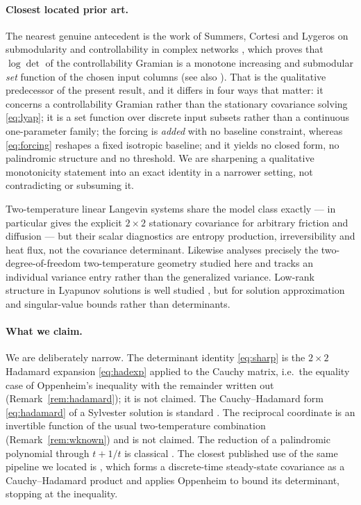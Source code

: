 \documentclass[11pt]{article}
\theoremstyle{plain}
\theoremstyle{definition}
\theoremstyle{remark}
\begin{document}
\paragraph{Closest located prior art.} The nearest genuine antecedent is the work of Summers,
Cortesi and Lygeros on submodularity and controllability in complex networks
\cite{SummersEtAl2016}, which proves that $\log\det$ of the controllability Gramian is a monotone
increasing and submodular \emph{set} function of the chosen input columns (see also
\cite{Antoulas2005}). That is the qualitative predecessor of the present result, and it differs in
four ways that matter: it concerns a controllability Gramian rather than the stationary covariance
solving \eqref{eq:lyap}; it is a set function over discrete input subsets rather than a continuous
one-parameter family; the forcing is \emph{added} with no baseline constraint, whereas
\eqref{eq:forcing} reshapes a fixed isotropic baseline; and it yields no closed form, no
palindromic structure and no threshold. We are sharpening a qualitative monotonicity statement
into an exact identity in a narrower setting, not contradicting or subsuming it.

Two-temperature linear Langevin systems
\cite{GodrecheLuck2019,FilligerReimann2007,DotsenkoEtAl2013} share the model class exactly --- in
particular \cite[\S2.10]{GodrecheLuck2019} gives the explicit $2\times2$ stationary covariance for
arbitrary friction and diffusion --- but their scalar diagnostics are entropy production,
irreversibility and heat flux, not the covariance determinant. Likewise
\cite{BoffiDeGregorio2024} analyses precisely the two-degree-of-freedom two-temperature geometry
studied here and tracks an individual variance entry rather than the generalized variance. Low-rank
structure in Lyapunov solutions is well studied
\cite{Simoncini2016,TownsendWilber2018}, but for solution approximation and singular-value bounds
rather than determinants.

\paragraph{What we claim.} We are deliberately narrow. The determinant identity
\eqref{eq:sharp} is the $2\times2$ Hadamard expansion \eqref{eq:hadexp} applied to the
Cauchy matrix, i.e.\ the equality case of Oppenheim's inequality with the remainder written
out (Remark~\ref{rem:hadamard}); it is not claimed. The Cauchy--Hadamard form
\eqref{eq:hadamard} of a Sylvester solution is standard
\cite{PalittaLefteriu2022,YadykinEtAl2023}. The reciprocal coordinate is an invertible function
of the usual two-temperature combination (Remark~\ref{rem:wknown}) and is not claimed. The
reduction of a palindromic polynomial through $t+1/t$ is classical \cite{Vieira2019}. The
closest published use of the same pipeline we located is
\cite[\S4.5]{SchlickDemissie2011}, which forms a discrete-time steady-state covariance as a
Cauchy--Hadamard product and applies Oppenheim to bound its determinant, stopping at the
inequality.
\end{document}
